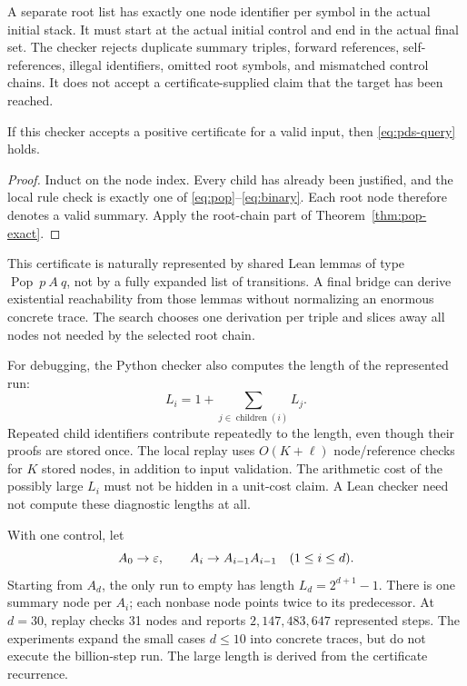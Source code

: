A separate root list has exactly one node identifier per symbol in the actual
initial stack. It must start at the actual initial control and end in the actual
final set. The checker rejects duplicate summary triples, forward references,
self-references, illegal identifiers, omitted root symbols, and mismatched
control chains. It does not accept a certificate-supplied claim that the target
has been reached.

\begin{proposition}
If this checker accepts a positive certificate for a valid input, then
\eqref{eq:pds-query} holds.
\end{proposition}
\begin{proof}
Induct on the node index. Every child has already been justified, and the local
rule check is exactly one of \eqref{eq:pop}--\eqref{eq:binary}. Each root node
therefore denotes a valid summary. Apply the root-chain part of
Theorem~\ref{thm:pop-exact}.
\end{proof}

This certificate is naturally represented by shared Lean lemmas of type
$\operatorname{Pop}\ p\ A\ q$, not by a fully expanded list of transitions.
A final bridge can derive existential reachability from those lemmas without
normalizing an enormous concrete trace. The search chooses one derivation per
triple and slices away all nodes not needed by the selected root chain.

For debugging, the Python checker also computes the length of the represented
run:
\[
 L_i=1+\sum_{j\in\operatorname{children}(i)}L_j.
\]
Repeated child identifiers contribute repeatedly to the length, even though
their proofs are stored once. The local replay uses $O(K+\ell)$ node/reference
checks for $K$ stored nodes, in addition to input validation. The arithmetic
cost of the possibly large $L_i$ must not be hidden in a unit-cost claim. A Lean
checker need not compute these diagnostic lengths at all.

\begin{example}
With one control, let
\[
 A_0\to\varepsilon,\qquad A_i\to A_{i-1}A_{i-1}\quad(1\leq i\leq d).
\]
Starting from $A_d$, the only run to empty has length
$L_d=2^{d+1}-1$. There is one summary node per $A_i$; each nonbase node points
twice to its predecessor. At $d=30$, replay checks 31 nodes and reports
$2,147,483,647$ represented steps. The experiments expand the small cases
$d\leq10$ into concrete traces, but do not execute the billion-step run. The
large length is derived from the certificate recurrence.
\end{example}

